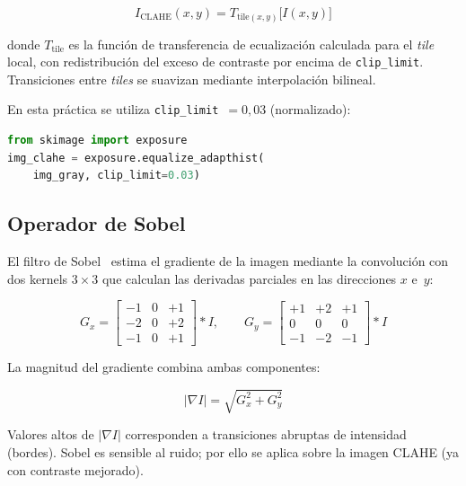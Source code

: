 \documentclass[12pt,a4paper]{article}
\begin{document}
\begin{equation}
	\boxed{I_{\mathrm{CLAHE}}(x,y)
		= T_{\mathrm{tile}(x,y)}\!\bigl[I(x,y)\bigr]}
	\label{eq:clahe}
\end{equation}

donde $T_{\mathrm{tile}}$ es la función de transferencia de ecualización
calculada para el \emph{tile} local, con redistribución del exceso de
contraste por encima de \texttt{clip\_limit}.  Transiciones entre
\emph{tiles} se suavizan mediante interpolación bilineal.

En esta práctica se utiliza \texttt{clip\_limit}~$= 0{,}03$ (normalizado):

\begin{lstlisting}[language=Python,caption={Aplicación de CLAHE con
  scikit-image.}]
from skimage import exposure
img_clahe = exposure.equalize_adapthist(
    img_gray, clip_limit=0.03)
\end{lstlisting}

\subsection{Operador de Sobel}
\label{subsec:sobel}

El filtro de Sobel~\cite{sobel1968} estima el gradiente de la imagen
mediante la convolución con dos kernels $3\times3$ que calculan las
derivadas parciales en las direcciones $x$ e~$y$:

\begin{equation}
	G_x = \begin{bmatrix} -1 & 0 & +1 \\ -2 & 0 & +2 \\ -1 & 0 & +1 \end{bmatrix}
	\ast I, \qquad
	G_y = \begin{bmatrix} +1 & +2 & +1 \\ 0 & 0 & 0 \\ -1 & -2 & -1 \end{bmatrix}
	\ast I
	\label{eq:sobel_kernels}
\end{equation}

La magnitud del gradiente combina ambas componentes:

\begin{equation}
	\boxed{|\nabla I| = \sqrt{G_x^2 + G_y^2}}
	\label{eq:sobel_mag}
\end{equation}

Valores altos de $|\nabla I|$ corresponden a transiciones abruptas de
intensidad (bordes).  Sobel es sensible al ruido; por ello se aplica
sobre la imagen CLAHE (ya con contraste mejorado).
\end{document}
